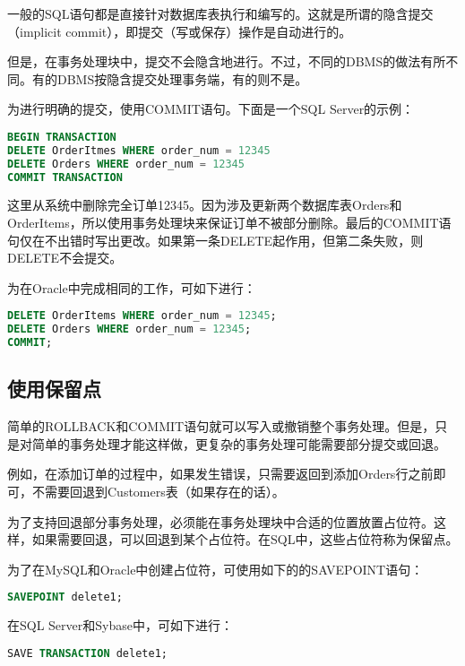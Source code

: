 一般的SQL语句都是直接针对数据库表执行和编写的。这就是所谓的隐含提交（implicit commit），即提交（写或保存）操作是自动进行的。

但是，在事务处理块中，提交不会隐含地进行。不过，不同的DBMS的做法有所不同。有的DBMS按隐含提交处理事务端，有的则不是。

为进行明确的提交，使用COMMIT语句。下面是一个SQL Server的示例：

\begin{lstlisting}[language=SQL]
BEGIN TRANSACTION
DELETE OrderItmes WHERE order_num = 12345
DELETE Orders WHERE order_num = 12345
COMMIT TRANSACTION
\end{lstlisting}

这里从系统中删除完全订单12345。因为涉及更新两个数据库表Orders和OrderItems，所以使用事务处理块来保证订单不被部分删除。最后的COMMIT语句仅在不出错时写出更改。如果第一条DELETE起作用，但第二条失败，则DELETE不会提交。

为在Oracle中完成相同的工作，可如下进行：

\begin{lstlisting}[language=SQL]
DELETE OrderItems WHERE order_num = 12345;
DELETE Orders WHERE order_num = 12345;
COMMIT;
\end{lstlisting}

\subsection{使用保留点}

简单的ROLLBACK和COMMIT语句就可以写入或撤销整个事务处理。但是，只是对简单的事务处理才能这样做，更复杂的事务处理可能需要部分提交或回退。

例如，在添加订单的过程中，如果发生错误，只需要返回到添加Orders行之前即可，不需要回退到Customers表（如果存在的话）。

为了支持回退部分事务处理，必须能在事务处理块中合适的位置放置占位符。这样，如果需要回退，可以回退到某个占位符。在SQL中，这些占位符称为保留点。

为了在MySQL和Oracle中创建占位符，可使用如下的的SAVEPOINT语句：

\begin{lstlisting}[language=SQL]
SAVEPOINT delete1;
\end{lstlisting}

在SQL Server和Sybase中，可如下进行：

\begin{lstlisting}[language=SQL]
SAVE TRANSACTION delete1;
\end{lstlisting}

